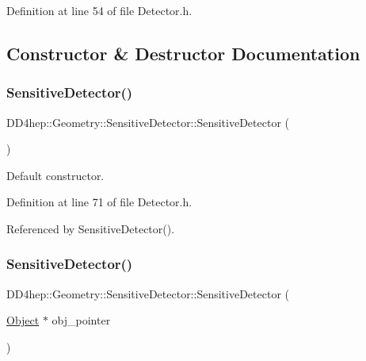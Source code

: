 Definition at line 54 of file Detector.\+h.



\subsection{Constructor \& Destructor Documentation}
\hypertarget{class_d_d4hep_1_1_geometry_1_1_sensitive_detector_a7582e36657fd4099441d82cdf12fe638}{}\label{class_d_d4hep_1_1_geometry_1_1_sensitive_detector_a7582e36657fd4099441d82cdf12fe638} 
\subsubsection{\texorpdfstring{Sensitive\+Detector()}{SensitiveDetector()}\hspace{0.1cm}{\footnotesize\ttfamily [1/6]}}
{\footnotesize\ttfamily D\+D4hep\+::\+Geometry\+::\+Sensitive\+Detector\+::\+Sensitive\+Detector (\begin{DoxyParamCaption}{ }\end{DoxyParamCaption})\hspace{0.3cm}{\ttfamily [inline]}}



Default constructor. 



Definition at line 71 of file Detector.\+h.



Referenced by Sensitive\+Detector().

\hypertarget{class_d_d4hep_1_1_geometry_1_1_sensitive_detector_a52024ca16cb8a4a3d81802ba224efbe3}{}\label{class_d_d4hep_1_1_geometry_1_1_sensitive_detector_a52024ca16cb8a4a3d81802ba224efbe3} 
\subsubsection{\texorpdfstring{Sensitive\+Detector()}{SensitiveDetector()}\hspace{0.1cm}{\footnotesize\ttfamily [2/6]}}
{\footnotesize\ttfamily D\+D4hep\+::\+Geometry\+::\+Sensitive\+Detector\+::\+Sensitive\+Detector (\begin{DoxyParamCaption}\item[{\hyperlink{class_d_d4hep_1_1_geometry_1_1_sensitive_detector_a0d3dbe95cad52849050e35e70a5cf784}{Object} $\ast$}]{obj\+\_\+pointer }\end{DoxyParamCaption})\hspace{0.3cm}{\ttfamily [inline]}}



